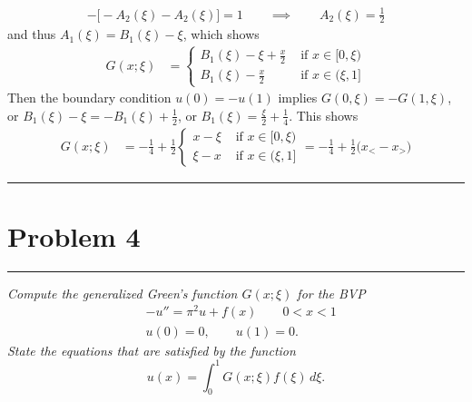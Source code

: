 \documentclass{article} %
\theoremstyle{plain}
\newcommand{\problem}[1]{
\vspace{.375cm}
\begin{minipage}{\textwidth}
    \begin{center}
        \noindent\rule{5cm}{1pt}
    \end{center}
    \section{\bf #1}
    \begin{center}
        \noindent\rule{5cm}{1pt}
    \end{center}
    \vspace{0.25cm}
\end{minipage}
}
\begin{document}
\begin{align*}
    -\Big[-A_2(\xi) - A_2(\xi)\Big] = 1 \qquad \implies \qquad A_2(\xi) = \frac{1}{2}
\end{align*}
and thus $A_1(\xi) = B_1(\xi) - \xi$, which shows
\begin{align*}
    G(x;\xi) &= \begin{cases}
        B_1(\xi) - \xi + \frac{x}{2} & \text{ if } x \in [0, \xi) \\
        B_1(\xi) - \frac{x}{2} & \text{ if } x \in (\xi, 1]
    \end{cases}
\end{align*}
Then the boundary condition $u(0) = -u(1)$ implies $G(0, \xi) = -G(1, \xi)$, or $B_1(\xi) - \xi = -B_1(\xi) + \frac{1}{2}$, or $B_1(\xi) = \frac{\xi}{2} + \frac{1}{4}$.  This shows
\begin{align*}
    G(x;\xi) &= -\frac{1}{4} + \frac{1}{2}\begin{cases}
        x - \xi & \text{ if } x \in [0, \xi) \\
        \xi - x & \text{ if } x \in (\xi, 1]
    \end{cases} = -\frac{1}{4} + \frac{1}{2}\Big(x_< - x_>\Big)
\end{align*}





\problem{Problem 4}
\emph{Compute the generalized Green's function $G(x;\xi)$ for the BVP
\begin{align*}
&-u'' = \pi^2 u + f(x)\qquad 0<x<1
\\
&u(0) = 0,\qquad u(1)=0.
\end{align*}
State the equations that are satisfied by the function
\[
u(x) = \int_0^1 G(x;\xi) f(\xi)\, d\xi.
\]}
\end{document}
